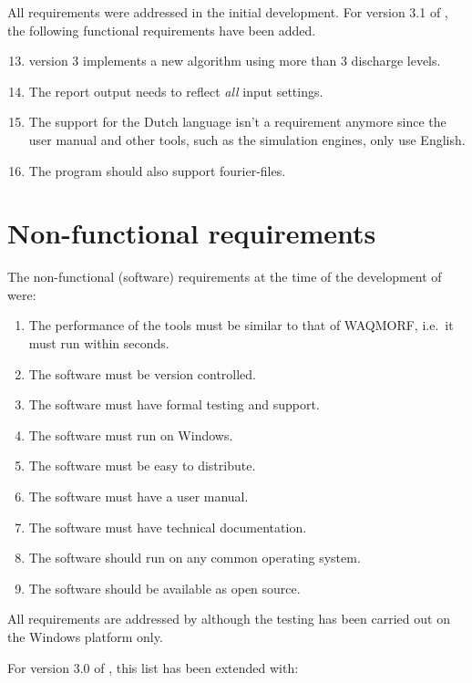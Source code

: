 All requirements were addressed in the initial development.
For version 3.1 of \dfastmi, the following functional requirements have been added.

\begin{enumerate}
\setcounter{enumi}{12} %
\item \dfastmi version 3 implements a new algorithm using more than 3 discharge levels.
\item The report output needs to reflect \emph{all} input settings.
\item The support for the Dutch language isn't a requirement anymore since the user manual and other tools, such as the simulation engines, only use English.
\item The program should also support \dflowfm fourier-files.
\end{enumerate}


\section{Non-functional requirements}

The non-functional (software) requirements at the time of the development of  were:

\begin{enumerate}
\item The performance of the tools must be similar to that of WAQMORF, i.e.~it must run within seconds.
\item The software must be version controlled.
\item The software must have formal testing and support.
\item The software must run on Windows.
\item The software must be easy to distribute.
\item The software must have a user manual.
\item The software must have technical documentation.

\item The software should run on any common operating system.
\item The software should be available as open source.
\end{enumerate}

All requirements are addressed by \dfastmi although the testing has been carried out on the Windows platform only.

For version 3.0 of \dfastmi, this list has been extended with:

